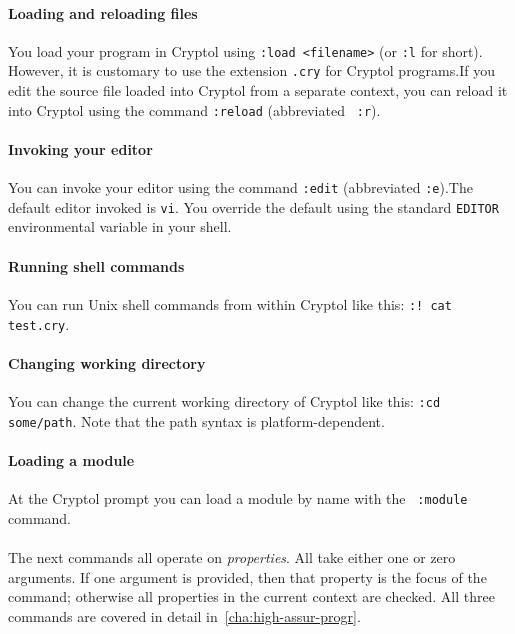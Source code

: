 \paragraph*{Loading and reloading files}
You load your program in Cryptol using {\tt :load <filename>} (or
\texttt{:l} for short).  However, it is customary to use the extension
{\tt .cry} for Cryptol programs.\indCmdLoad If you edit the source
file loaded into Cryptol from a separate context, you can reload it
into Cryptol using the command {\tt :reload} (abbreviated {\tt
  :r}).\indCmdReload

\paragraph*{Invoking your editor}
You can invoke your editor using the command {\tt :edit} (abbreviated
\texttt{:e}).\indCmdEdit The default editor invoked is
\texttt{vi}.  You override the default using the standard
\texttt{EDITOR} environmental variable in your shell.\indSettingEditor


\paragraph*{Running shell commands}
You can run Unix shell commands from within Cryptol like this:
\texttt{:!~cat test.cry}.\indCmdShell

\paragraph*{Changing working directory}
You can change the current working directory of Cryptol like this:
\texttt{:cd some/path}.  Note that the path syntax is
platform-dependent.

\paragraph*{Loading a module}
At the Cryptol prompt you can load a module by name with the {\tt
  :module} command.\indCmdLoadModule

\paragraph*{}
The next commands all operate on \emph{properties}.  All take
either one or zero arguments.  If one argument is provided, then that
property is the focus of the command; otherwise all properties in the
current context are checked.  All three commands are covered in detail
in~\autoref{cha:high-assur-progr}.

